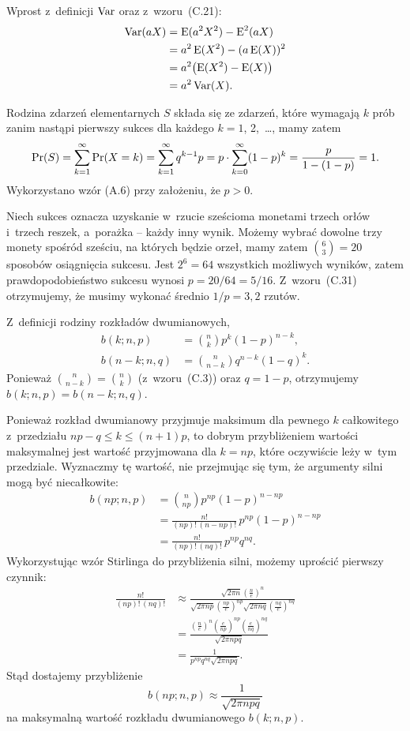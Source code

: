 \exercise{} %
Wprost z~definicji $\operatorname{Var}$ oraz z~wzoru~(C.21):
\begin{align*}
	\operatorname{Var}(aX) &= \operatorname{E}(a^2X^2)-\operatorname{E}^2(aX) \\
	&= a^2\operatorname{E}(X^2)-(a\operatorname{E}(X))^2 \\
	&= a^2\bigl(\operatorname{E}(X^2)-\operatorname{E}(X)\bigr) \\
	&= a^2\operatorname{Var}(X).
\end{align*}


\exercise{} %
Rodzina zdarzeń elementarnych $S$ składa się ze zdarzeń, które wymagają $k$ prób zanim nastąpi pierwszy sukces dla każdego $k=1$, 2,~\dots, mamy zatem
\[
	\Pr(S) = \sum_{k=1}^\infty\Pr(X=k) = \sum_{k=1}^\infty q^{k-1}p = p\cdot\sum_{k=0}^\infty (1-p)^k = \frac{p}{1-(1-p)} \\[1mm] = 1.
\]
Wykorzystano wzór (A.6) przy założeniu, że $p>0$.

\exercise{} %
Niech sukces oznacza uzyskanie w~rzucie sześcioma monetami trzech orłów i~trzech reszek, a~porażka -- każdy inny wynik. Możemy wybrać dowolne trzy monety spośród sześciu, na których będzie orzeł, mamy zatem $\binom{6}{3}=20$ sposobów osiągnięcia sukcesu. Jest $2^6=64$ wszystkich możliwych wyników, zatem prawdopodobieństwo sukcesu wynosi $p=20/64=5/16$. Z~wzoru~(C.31) otrzymujemy, że musimy wykonać średnio $1/p=3{,}2$ rzutów.

\exercise{} %
Z~definicji rodziny rozkładów dwumianowych,
\begin{align*}
	b(k;n,p) &= \binom{n}{k}p^k(1-p)^{n-k}, \\
	b(n-k;n,q) &= \binom{n}{n-k}q^{n-k}(1-q)^k.
\end{align*}
Ponieważ $\binom{n}{n-k}=\binom{n}{k}$ (z~wzoru~(C.3)) oraz $q=1-p$, otrzymujemy $b(k;n,p)=b(n-k;n,q)$.

\exercise{} %
Ponieważ rozkład dwumianowy przyjmuje maksimum dla pewnego $k$ całkowitego z~przedziału $np-q\le k\le(n+1)p$, to dobrym przybliżeniem wartości maksymalnej jest wartość przyjmowana dla $k=np$, które oczywiście leży w~tym przedziale. Wyznaczmy tę wartość, nie przejmując się tym, że argumenty silni mogą być niecałkowite:
\begin{align*}
	b(np;n,p) &= \binom{n}{np}p^{np}(1-p)^{n-np} \\
	&= \frac{n!}{(np)!\,(n-np)!}\,p^{np}(1-p)^{n-np} \\
	&= \frac{n!}{(np)!\,(nq)!}\,p^{np}q^{nq}.
\end{align*}
Wykorzystując wzór Stirlinga do przybliżenia silni, możemy uprościć pierwszy czynnik:
\begin{align*}
	\frac{n!}{(np)!\,(nq)!} &\approx \frac{\sqrt{2\pi n}\left(\frac{n}{e}\right)^n}{\sqrt{2\pi np}\left(\frac{np}{e}\right)^{np}\sqrt{2\pi nq}\left(\frac{nq}{e}\right)^{nq}} \\[1mm]
	&= \frac{\left(\frac{n}{e}\right)^n\left(\frac{e}{np}\right)^{np}\left(\frac{e}{nq}\right)^{nq}}{\sqrt{2\pi npq}} \\[1mm]
	&= \frac{1}{p^{np}q^{nq}\sqrt{2\pi npq}}.
\end{align*}
Stąd dostajemy przybliżenie
\[
	b(np;n,p) \approx \frac{1}{\sqrt{2\pi npq}}
\]
na maksymalną wartość rozkładu dwumianowego $b(k;n,p)$.

